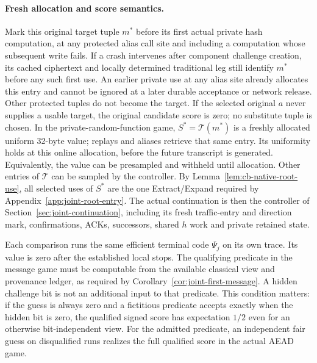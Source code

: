 \paragraph{Fresh allocation and score semantics.}
Mark this original target tuple $m^*$ before its first actual private hash
computation, at any protected alias call site and including a computation
whose subsequent write fails. If a crash intervenes after component
challenge creation, its cached ciphertext and locally determined traditional
leg still identify $m^*$ before any such first use. An earlier private use
at any alias site already allocates this entry and cannot be ignored at a
later durable acceptance or network release. Other protected tuples do not
become the target. If the selected original $a$ never supplies a usable
target, the original candidate score is zero; no substitute tuple is chosen.
In the private-random-function game,
$S^*=\mathcal T(m^*)$ is a freshly allocated uniform 32-byte value;
replays and aliases retrieve that same entry. Its uniformity holds at
this online allocation, before the future transcript is generated.
Equivalently, the value can be presampled and withheld until allocation.
Other entries of $\mathcal T$ can be sampled by the controller. By
Lemma~\ref{lem:cb-native-root-use}, all selected uses of $S^*$ are the
one Extract/Expand required by Appendix~\ref{app:joint-root-entry}.
The actual continuation is then the controller of
Section~\ref{sec:joint-continuation}, including its fresh traffic-entry
and direction mark, confirmations, ACKs, successors, shared $h$ work and
private retained state.

Each comparison runs the same efficient terminal code $\Psi_j$ on its own
trace. Its value is zero after the established local stops. The qualifying
predicate in the message game must be computable from the available
classical view and provenance ledger, as required by
Corollary~\ref{cor:joint-first-message}. A hidden challenge bit is not an
additional input to that predicate. This condition matters: if the guess
is always zero and a fictitious predicate accepts exactly when the hidden
bit is zero, the qualified signed score has expectation $1/2$ even for an
otherwise bit-independent view. For the admitted predicate, an independent
fair guess on disqualified runs realizes the full qualified score in the
actual AEAD game.

